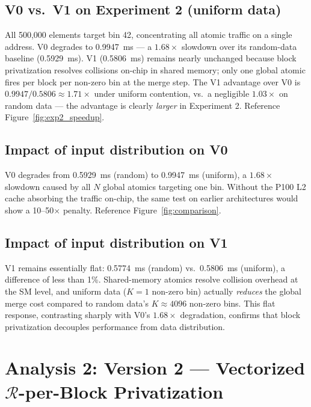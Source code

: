 \documentclass[11pt, letterpaper]{article}
\newcommand{\EOneVZeroAvg}{0.5929}
\newcommand{\EOneVOneAvg}{0.5774}
\newcommand{\ETwoVZeroAvg}{0.9947}
\newcommand{\ETwoVOneAvg}{0.5806}
\begin{document}
\subsection*{V0 vs.\ V1 on Experiment 2 (uniform data)}

All 500{,}000 elements target bin 42, concentrating all atomic traffic on a
single address.
V0 degrades to \ETwoVZeroAvg~ms --- a $1.68\times$ slowdown over its
random-data baseline (\EOneVZeroAvg~ms).
V1 (\ETwoVOneAvg~ms) remains nearly unchanged because block privatization
resolves collisions on-chip in shared memory; only one global atomic fires
per block per non-zero bin at the merge step.
The V1 advantage over V0 is $\ETwoVZeroAvg/\ETwoVOneAvg \approx 1.71\times$
under uniform contention, vs.\ a negligible $1.03\times$ on random data ---
the advantage is clearly \emph{larger} in Experiment 2.
Reference Figure~\ref{fig:exp2_speedup}.

\subsection*{Impact of input distribution on V0}

V0 degrades from \EOneVZeroAvg~ms (random) to \ETwoVZeroAvg~ms (uniform),
a $1.68\times$ slowdown caused by all $N$ global atomics targeting one bin.
Without the P100 L2 cache absorbing the traffic on-chip, the same test on
earlier architectures would show a 10--50$\times$ penalty.
Reference Figure~\ref{fig:comparison}.

\subsection*{Impact of input distribution on V1}

V1 remains essentially flat: \EOneVOneAvg~ms (random) vs.\
\ETwoVOneAvg~ms (uniform), a difference of less than 1\%.
Shared-memory atomics resolve collision overhead at the SM level, and
uniform data ($K=1$ non-zero bin) actually \emph{reduces} the global merge
cost compared to random data's $K\approx4096$ non-zero bins.
This flat response, contrasting sharply with V0's $1.68\times$ degradation,
confirms that block privatization decouples performance from data distribution.

\section{Analysis 2: Version 2 — Vectorized $\mathcal{R}$-per-Block Privatization}
\end{document}
